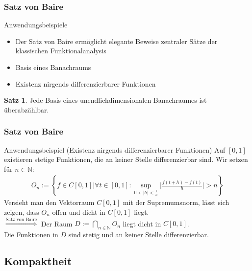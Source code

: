 \documentclass[t, handout]{beamer}
\newcommand{\N}{\mathbb{N}}
\theoremstyle{definition} %
\newtheorem{sa}{Satz}[section] %
\begin{document}
\begin{frame}
\frametitle{Satz von Baire}
\begin{block}{Anwendungsbeispiele}
\begin{itemize}
\item Der Satz von Baire ermöglicht elegante Beweise zentraler Sätze der klassischen Funktionalanalysis
\item Basis eines Banachraums
\item Existenz nirgends differenzierbarer Funktionen
\end{itemize}
\end{block}
\pause
\begin{sa}
Jede Basis eines unendlichdimensionalen Banachraumes ist überabzählbar.
\end{sa}
\end{frame}

\begin{frame}
\frametitle{Satz von Baire}
\begin{block}{Anwendungsbeispiel (Existenz nirgends differenzierbarer Funktionen)}
Auf $[0, 1]$ existieren stetige Funktionen, die an keiner Stelle differenzierbar sind. Wir setzen für $n \in \N$:
\begin{align*}
O_n := \left\{ f \in C[0,1] \bigg\vert \forall t \in [0,1]: \sup_{0<|h|<\frac{1}{n}}{\bigg\vert\frac{f(t+h)-f(t)}{h}\bigg\vert} > n \right\}
\end{align*}
Versieht man den Vektorraum $C[0,1]$ mit der Supremumsnorm, lässt sich zeigen, dass $O_n$ offen und dicht in $C[0,1]$ liegt.\\
\vspace{0.3cm}
$\overset{\text{Satz von Baire}}\Longrightarrow$ Der Raum $D := \bigcap\limits_{n \in \N}{O_n}$ liegt dicht in $C[0,1]$.\\
\vspace{0.3cm}
 Die Funktionen in $D$ sind stetig und an keiner Stelle differenzierbar.
\end{block}
\end{frame}

\subsection{Kompaktheit}
\end{document}
